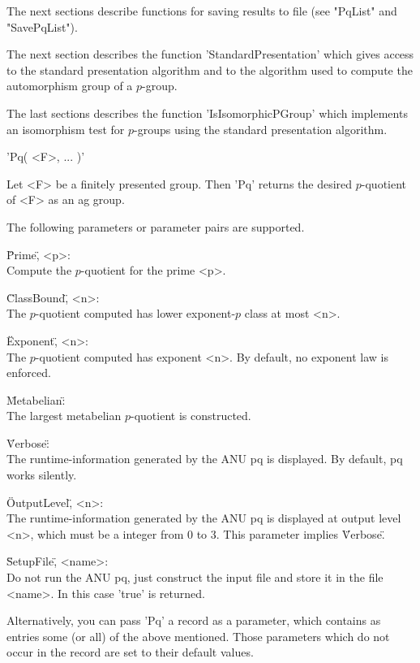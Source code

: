 The next sections describe  functions for  saving  results  to  file (see
"PqList" and "SavePqList").

The  next  section describes  the  function 'StandardPresentation'  which
gives access to the standard presentation algorithm and to the  algorithm
used to compute the automorphism group of a $p$-group.

The  last sections  describes  the  function  'IsIsomorphicPGroup'  which
implements  an  isomorphism  test  for  $p$-groups  using  the   standard
presentation algorithm.


'Pq( <F>, ... )'

Let <F> be a  finitely presented  group.  Then  'Pq' returns  the desired
$p$-quotient of <F> as an ag group.

The following parameters or parameter pairs are supported.

\"Prime\", <p>: \\
    Compute the $p$-quotient for the prime <p>.

\"ClassBound\", <n>: \\
    The $p$-quotient computed has lower exponent-$p$ class at most <n>.

\"Exponent\", <n>: \\
    The $p$-quotient computed has exponent <n>.
    By default, no exponent law is enforced.

\"Metabelian\": \\
    The largest metabelian $p$-quotient is constructed.

\"Verbose\": \\
    The runtime-information generated  by  the ANU  pq is  displayed.  By
    default, pq works silently.

\"OutputLevel\", <n>: \\
    The runtime-information  generated by the  ANU  pq  is  displayed  at
    output  level  <n>,  which  must  be a  integer from  0 to  3.   This
    parameter implies \"Verbose\".

\"SetupFile\", <name>: \\
    Do not run the ANU pq, just  construct the input file and store it in
    the file <name>. In this case 'true' is returned.

Alternatively, you can pass 'Pq' a record as a parameter, which  contains
as entries some (or all)  of the above mentioned.  Those parameters which
do not occur in the record are set to their default values.

